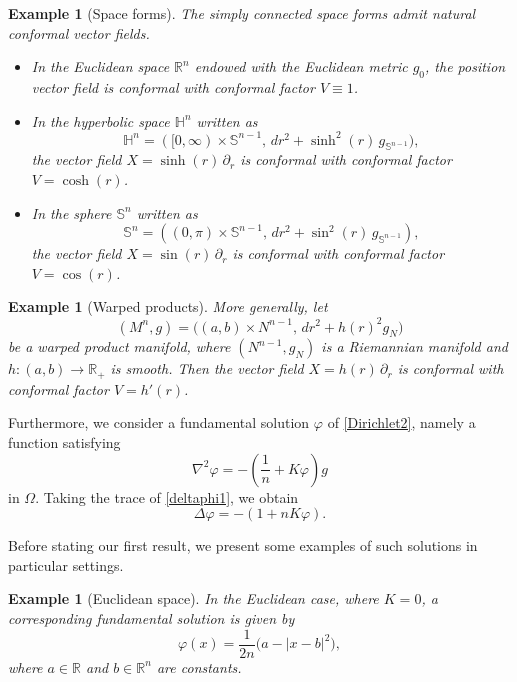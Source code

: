 \documentclass[reqno,11pt]{amsart}
\numberwithin{equation}{section}  %
\newtheorem{example}[theorem]{Example}
\begin{document}
\begin{example}[Space forms]\label{space_forms}
The simply connected space forms admit natural conformal vector fields.

\begin{itemize}
    \item In the Euclidean space $\mathbb{R}^{n}$ endowed with the Euclidean metric $g_{0}$, the position vector field is conformal with conformal factor $V\equiv 1$.

    \item In the hyperbolic space $\mathbb{H}^{n}$ written as
    \[
    \mathbb{H}^{n}=([0,\infty)\times \mathbb{S}^{n-1},\,dr^{2}+\sinh^{2}(r)\,g_{\mathbb{S}^{n-1}}),
    \]
    the vector field \(X=\sinh(r)\,\partial_{r}\)
    is conformal with conformal factor $V=\cosh(r)$.
    

    \item In the sphere $\mathbb{S}^{n}$ written as
    \[
    \mathbb{S}^{n}=((0,\pi)\times \mathbb{S}^{n-1},\,dr^{2}+\sin^{2}(r)\,g_{\mathbb{S}^{n-1}}),
    \]
    the vector field $X=\sin(r)\,\partial_{r}$
    is conformal with conformal factor $V=\cos(r)$.
\end{itemize}
\end{example}

\begin{example}[Warped products]
More generally, let
\[
(M^{n},g)=\bigl((a,b)\times N^{n-1},\,dr^{2}+h(r)^{2}g_{N}\bigr)
\]
be a warped product manifold, where $(N^{n-1},g_{N})$ is a Riemannian manifold and $h\colon(a,b)\to\mathbb{R}_{+}$ is smooth. Then the vector field $X=h(r)\,\partial_{r}$ is conformal with conformal factor $V=h'(r)$.
\end{example}

Furthermore, we consider a fundamental solution $\varphi$ of \eqref{Dirichlet2}, namely a function satisfying
\begin{equation}\label{deltaphi1}
\nabla^{2}\varphi
=
-\left(\frac{1}{n}+K\varphi\right)g
\end{equation}
in $\Omega$. Taking the trace of \eqref{deltaphi1}, we obtain
\begin{equation}\label{deltaphi}
\Delta \varphi
=
-\left(1+nK\varphi\right).
\end{equation}

Before stating our first result, we present some examples of such solutions in particular settings.

\begin{example}[Euclidean space]
In the Euclidean case, where $K=0$, a corresponding fundamental solution is given by
\[
\varphi(x)=\frac{1}{2n}\bigl(a-|x-b|^{2}\bigr),
\]
where $a\in\mathbb{R}$ and $b\in\mathbb{R}^{n}$ are constants.
\end{example}
\end{document}
